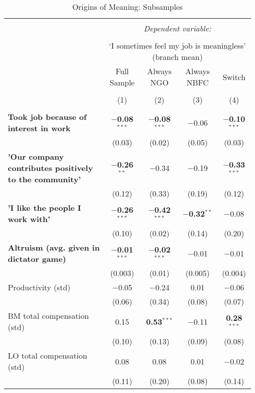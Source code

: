 \documentclass[11pt]{article}
\begin{document}
\begin{table}[!htbp] \centering 
  \caption{Origins of Meaning: Subsamples} 
  \label{} 
\footnotesize 
\begin{tabular}{lcccc} 
\\[-1.8ex]\hline 
\hline \\[-1.8ex] 
 & \multicolumn{4}{c}{\textit{Dependent variable:}} \\ 
\cline{2-5} 
\\[-1.8ex] & \multicolumn{4}{c}{`I sometimes feel my job is meaningless' (branch mean)} \\ 
 & Full Sample & Always NGO & Always NBFC & Switch \\ 
\\[-1.8ex] & (1) & (2) & (3) & (4)\\ 
\hline \\[-1.8ex] 
 \textbf{Took job because of interest in work} & \textbf{$-$0.08$^{***}$} & \textbf{$-$0.08$^{***}$} & $-$0.06 & \textbf{$-$0.10$^{***}$} \\ 
  & (0.03) & (0.02) & (0.05) & (0.03) \\ 
  \textbf{'Our company contributes positively to the community'} & \textbf{$-$0.26$^{**}$} & $-$0.34 & $-$0.19 & \textbf{$-$0.33$^{***}$} \\ 
  & (0.12) & (0.33) & (0.19) & (0.12) \\ 
  \textbf{'I like the people I work with'} & \textbf{$-$0.26$^{***}$} & \textbf{$-$0.42$^{***}$} & \textbf{$-$0.32$^{**}$} & $-$0.08 \\ 
  & (0.10) & (0.02) & (0.14) & (0.20) \\ 
  \textbf{Altruism (avg. given in dictator game)} & \textbf{$-$0.01$^{***}$} & \textbf{$-$0.02$^{***}$} & $-$0.01 & $-$0.01 \\ 
  & (0.003) & (0.01) & (0.005) & (0.004) \\ 
  Productivity (std) & $-$0.05 & $-$0.24 & 0.01 & $-$0.06 \\ 
  & (0.06) & (0.34) & (0.08) & (0.07) \\ 
  BM total compensation (std) & 0.15 & \textbf{0.53$^{***}$} & $-$0.11 & \textbf{0.28$^{***}$} \\ 
  & (0.10) & (0.13) & (0.09) & (0.08) \\ 
  LO total compensation (std) & 0.08 & 0.08 & 0.01 & $-$0.02 \\ 
  & (0.11) & (0.20) & (0.08) & (0.14) \\ 

\end{tabular}
\end{table}
\end{document}
